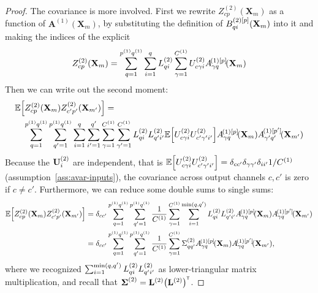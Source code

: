 \documentclass[tablecaption=bottom,wcp,nonatbib]{jmlr} %
\newcommand{\vX}{\mathbf{X}}
\newcommand{\vA}{\mathbf{A}}
\newcommand{\tp}{{\mathrm{\textsf{\tiny T}}}}
\newcommand{\bracket}[3]{{\left#1 #3 \right#2}}
\newcommand{\bra}{\bracket{(}{)}}
\newcommand{\sqb}{\bracket{[}{]}}
\begin{document}
{{\begin{proof}
  The covariance is more involved. First we rewrite $Z_{cp}^{(2)}(\vX_m)$ as a
  function of $\vA^{(1)}(\vX_m)$, by substituting the definition of
  $\layerBsp{(2)[\patch]}{\patchidx i}(\vX_m)$ into it and making the indices of
  the \MatMul explicit
  \begin{equation}
    Z_{cp}^{(2)}(\vX_m) = \sum_{\patchidx=1}^{\patchsize{1}} \sum_{i=1}^{\patchidx}
    \priorLscov{2}_{\patchidx i}  \sum_{\gamma=1}^{\layerC{1}} \layerUs{2}_{c\gamma i}
    \layerNLAsmp{(1)[\patch]}{\gamma\patchidx}{\vX_m}
  \end{equation}
  Then we can write out the second moment:
  \begin{equation}
    \begin{aligned}
    &\ExpSymb\sqb{Z_{cp}^{(2)}(\vX_m) Z_{c'p'}^{(2)}(\vX_{m'})} =  \\
    &\hspace{1em} \sum_{\patchidx=1}^{\patchsize{1}} \sum_{\patchidx'=1}^{\patchsize{1}}
                  \sum_{i=1}^{\patchidx}\sum_{i'=1}^{\patchidx'}
                  \sum_{\gamma=1}^{\layerC{1}} \sum_{\gamma'=1}^{\layerC{1}} 
                  \priorLscov{2}_{\patchidx i} \priorLscov{2}_{\patchidx' i'}
                  \ExpSymb\sqb{\layerUs{2}_{c\gamma i}
                  \layerUs{2}_{c'\gamma' i'}}
                  \layerNLAsmp{(1)[\patch]}{\gamma\patchidx}{\vX_m}
                  \layerNLAsmp{(1)[\patch']}{\gamma'\patchidx'}{\vX_{m'}}
  \end{aligned}
  \end{equation}
  Because the $\mathbf{U}^{(2)}_{i}$ are independent, that is
  $ \ExpSymb\sqb{\layerUs{2}_{c\gamma i}
    \layerUs{2}_{c'\gamma' i'}} = \delta_{cc'} \delta_{\gamma\gamma'}
  \delta_{ii'} 1/\layerC{1}$ (assumption~\ref{ass:avar-inputs}),
  the covariance across output channels $c, c'$ is zero if $c\neq c'$.
  Furthermore, we can reduce some double sums to single sums:
  \begin{align}
    \ExpSymb\sqb{Z_{cp}^{(2)}(\vX_m) Z_{c'p'}^{(2)}(\vX_{m'})} &= \delta_{cc'}
    \sum_{\patchidx=1}^{\patchsize{1}}
    \sum_{\patchidx'=1}^{\patchsize{1}}
    \frac{1}{\layerC{1}}\sum_{\gamma=1}^{\layerC{1}}
    \sum_{i=1}^{\text{min}(\patchidx, \patchidx')}
    \priorLscov{2}_{\patchidx i} \priorLscov{2}_{\patchidx' i'}
    \layerNLAsmp{(1)[\patch]}{\gamma\patchidx}{\vX_m}
    \layerNLAsmp{(1)[\patch']}{\gamma\patchidx}{\vX_{m'}} \\
                                                              &= \delta_{cc'}\sum_{\patchidx=1}^{\patchsize{1}}
    \sum_{\patchidx'=1}^{\patchsize{1}}
    \frac{1}{\layerC{1}}\sum_{\gamma=1}^{\layerC{1}}
    \priorWcovs{2}_{\patchidx \patchidx'}
    \layerNLAsmp{(1)[\patch]}{\gamma\patchidx}{\vX_m}
    \layerNLAsmp{(1)[\patch']}{\gamma\patchidx}{\vX_{m'}},
  \end{align}
  where we recognized $ \sum_{i=1}^{\text{min}(q, q')}
  L^{(2)}_{q i} L^{(2)}_{q' i'}$ as lower-triangular matrix multiplication,
  and recall that $\priorWcov{2} = \priorLcov{2}\bra{\priorLcov{2}}^\tp$.


\end{proof}}}
\end{document}
